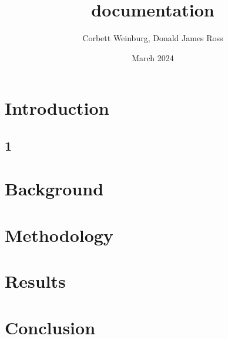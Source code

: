 \documentclass{article}
\title{documentation}
\author{Corbett Weinburg, Donald James Ross}
\date{March 2024}
\begin{document}
\maketitle

\section{Introduction}
\subsection{1}

\section{Background}

\section{Methodology}

\section{Results}

\section{Conclusion}
\end{document}
